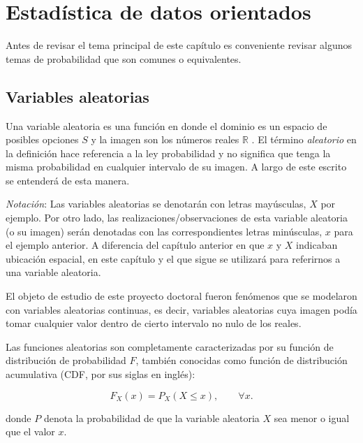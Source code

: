 \chapter{Estad\'istica de datos orientados}
\label{ch:prob}

Antes de revisar el tema principal de este cap\'itulo es conveniente revisar algunos temas de probabilidad que son comunes o equivalentes.

\section{Variables aleatorias}
\label{s:randomVar}

Una variable aleatoria es una funci\'on en donde el dominio es un espacio de posibles opciones $S$ y la imagen son los n\'umeros reales $\mathbb{R}$ \citep{casella_statistical_2002}.
El t\'ermino \textit{aleatorio} en la definici\'on hace referencia a la ley probabilidad y no significa que tenga la misma probabilidad en cualquier intervalo de su imagen. A largo de este escrito se entender\'a de esta manera.

\textit{Notaci\'on}: Las variables aleatorias se denotar\'an con letras may\'usculas, $X$ por ejemplo. Por otro lado, las realizaciones/observaciones de esta variable aleatoria (o su imagen) ser\'an denotadas con las correspondientes letras min\'usculas, $x$ para el ejemplo anterior. A diferencia del cap\'itulo anterior en que $x$ y $X$ indicaban ubicaci\'on espacial, en este cap\'itulo y el que sigue se utilizar\'a para referirnos a una variable aleatoria.

El objeto de estudio de este proyecto doctoral fueron fen\'omenos que se modelaron con variables aleatorias continuas, es decir, variables aleatorias cuya imagen pod\'ia tomar cualquier valor dentro de cierto intervalo no nulo de los reales.

Las funciones aleatorias son completamente caracterizadas por su funci\'on de distribuci\'on de probabilidad $F$, tambi\'en conocidas como funci\'on de distribuci\'on acumulativa (CDF, por sus siglas en ingl\'es):

\begin{equation}
	F_X(x) = P_X(X \le x), \qquad \forall x. 
	\label{e:cdf1D}
\end{equation}

\noindent
donde $P$ denota la probabilidad de que la variable aleatoria $X$ sea menor o igual que el valor $x$.

